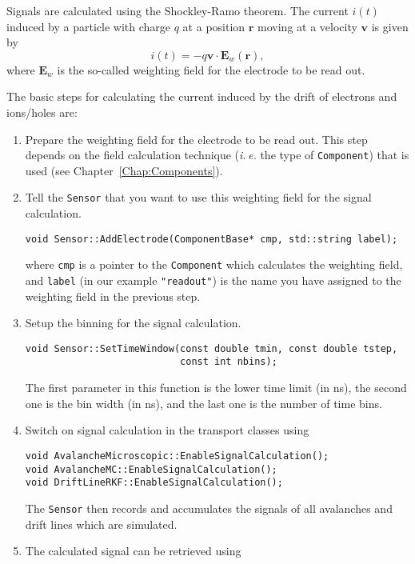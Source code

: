 Signals are calculated using the Shockley-Ramo theorem. 
The current \(i\left(t\right)\) induced by a particle with charge 
\(q\) at a position \(\mathbf{r}\) moving at a velocity \(\mathbf{v}\)
is given by
\begin{equation*}
  i\left(t\right) = -q \mathbf{v} \cdot \mathbf{E}_{w}\left(\mathbf{r}\right),
\end{equation*}
where \(\mathbf{E}_{w}\) is the so-called weighting field for the 
electrode to be read out. 

The basic steps for calculating the current induced 
by the drift of electrons and ions/holes are:
\begin{enumerate}
  \item
  Prepare the weighting field for the electrode to be read out. 
  This step depends on the field calculation technique 
  (\textit{i.\,e.} the type of \texttt{Component}) that is used 
  (see Chapter~\ref{Chap:Components}). 
  \item
  Tell the \texttt{Sensor} that you want to use this 
  weighting field for the signal calculation. 
  \begin{lstlisting}
void Sensor::AddElectrode(ComponentBase* cmp, std::string label);
  \end{lstlisting}
  where \texttt{cmp} is a pointer to the \texttt{Component} 
  which calculates the weighting field, and \texttt{label} 
  (in our example \texttt{"readout"}) is 
  the name you have assigned to the weighting field in the previous step.
  \item
  Setup the binning for the signal calculation.
  \begin{lstlisting}
void Sensor::SetTimeWindow(const double tmin, const double tstep, 
                           const int nbins);
  \end{lstlisting}
  The first parameter in this function is the lower time limit (in ns), 
  the second one is the bin width (in ns), and the last one 
  is the number of time bins.
  \item
  Switch on signal calculation in the transport classes using 
  \begin{lstlisting}
void AvalancheMicroscopic::EnableSignalCalculation();
void AvalancheMC::EnableSignalCalculation();
void DriftLineRKF::EnableSignalCalculation();
  \end{lstlisting}
  The \texttt{Sensor} then records and accumulates the signals of all 
  avalanches and drift lines which are simulated.
  \item
  The calculated signal can be retrieved using 

\end{enumerate}
